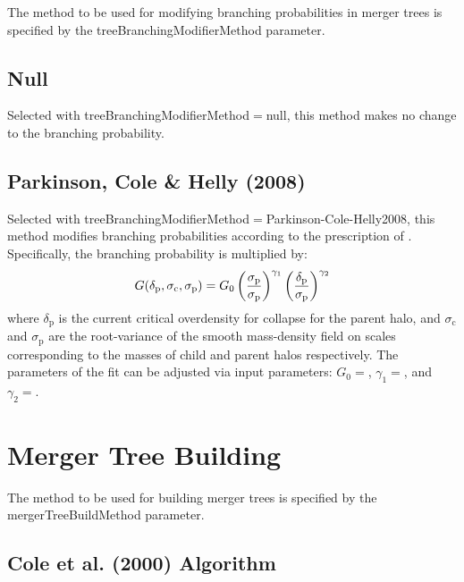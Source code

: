 The method to be used for modifying branching probabilities in merger trees is specified by the {\normalfont \ttfamily treeBranchingModifierMethod} parameter.

\subsection{Null}

Selected with {\normalfont \ttfamily treeBranchingModifierMethod}$=${\normalfont \ttfamily null}, this method makes no change to the branching probability.

\subsection{Parkinson, Cole \& Helly (2008)}

Selected with {\normalfont \ttfamily treeBranchingModifierMethod}$=${\normalfont \ttfamily Parkinson-Cole-Helly2008}, this method modifies branching probabilities according to the prescription of \cite{parkinson_generating_2008}. Specifically, the branching probability is multiplied by:
\begin{equation}
 G(\delta_{\mathrm p},\sigma_{\mathrm c},\sigma_{\mathrm p}) = G_0 \left({\sigma_{\mathrm p}\over\sigma_{\mathrm p}}\right)^{\gamma_1} \left({\delta_{\mathrm p}\over\sigma_{\mathrm p}}\right)^{\gamma_2}
\end{equation}
where $\delta_{\mathrm p}$ is the current critical overdensity for collapse for the parent halo, and $\sigma_{\mathrm c}$ and $\sigma_{\mathrm p}$ are the root-variance of the smooth mass-density field on scales corresponding to the masses of child and parent halos respectively. The parameters of the fit can be adjusted via input parameters: $G_0=${\normalfont \ttfamily [modifiedPressSchechterG0]}, $\gamma_1=${\normalfont \ttfamily [modifiedPressSchechterGamma1]}, and $\gamma_2=${\normalfont \ttfamily [modifiedPressSchechterGamma2]}.

\section{Merger Tree Building}

The method to be used for building merger trees is specified by the {\normalfont \ttfamily mergerTreeBuildMethod} parameter.

\subsection{Cole et al. (2000) Algorithm}


